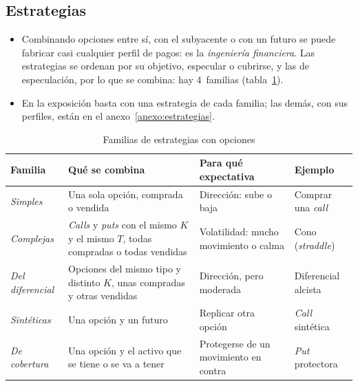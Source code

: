 \documentclass[11pt]{article}
\begin{document}
\subsection{Estrategias}\label{sec:estrategias-opciones}

\begin{itemize}
\item Combinando opciones entre sí, con el subyacente o con un futuro se puede fabricar casi cualquier perfil de pagos: es la \emph{ingeniería financiera}. Las estrategias se ordenan por su objetivo, especular o cubrirse, y las de especulación, por lo que se combina: hay 4~familias (tabla~\ref{tab:familias-estrategias}).
\item En la exposición basta con una estrategia de cada familia; las demás, con sus perfiles, están en el anexo~\ref{anexo:estrategias}.
\end{itemize}

\begin{table}[H]
\centering
\caption{Familias de estrategias con opciones}\label{tab:familias-estrategias}
\small
\begin{tabular}{>{\raggedright\arraybackslash}m{2.6cm}>{\raggedright\arraybackslash}m{5.1cm}>{\raggedright\arraybackslash}m{3.4cm}>{\raggedright\arraybackslash}m{3.1cm}}
\toprule
\rowcolor{tceeazulpalido}\textbf{Familia} & \textbf{Qué se combina} & \textbf{Para qué expectativa} & \textbf{Ejemplo}\\
\midrule
\emph{Simples} & Una sola opción, comprada o vendida & Dirección: sube o baja & Comprar una \emph{call}\\
\addlinespace[0.2em]
\emph{Complejas} & \emph{Calls} y \emph{puts} con el mismo $K$ y el mismo $T$, todas compradas o todas vendidas & Volatilidad: mucho movimiento o calma & Cono (\emph{straddle})\\
\addlinespace[0.2em]
\emph{Del diferencial} & Opciones del mismo tipo y distinto $K$, unas compradas y otras vendidas & Dirección, pero moderada & Diferencial alcista\\
\addlinespace[0.2em]
\emph{Sintéticas} & Una opción y un futuro & Replicar otra opción & \emph{Call} sintética\\
\addlinespace[0.2em]
\rowcolor{tceesalvia}\emph{De cobertura} & Una opción y el activo que se tiene o se va a tener & Protegerse de un movimiento en contra & \emph{Put} protectora\\
\bottomrule
\end{tabular}
\end{table}
\end{document}

